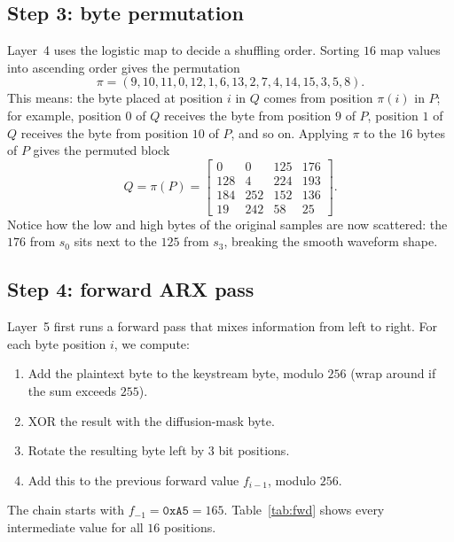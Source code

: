 \documentclass[pdflatex,sn-mathphys-num]{sn-jnl}%
\theoremstyle{thmstyleone}%
\theoremstyle{thmstyletwo}%
\theoremstyle{thmstylethree}%
\begin{document}
\subsection{Step 3: byte permutation}

Layer~4 uses the logistic map to decide a shuffling order. Sorting $16$ map values into ascending order gives the permutation
\begin{equation*}
\pi=(9,10,11,0,12,1,6,13,2,7,4,14,15,3,5,8).
\end{equation*}
This means: the byte placed at position $i$ in $Q$ comes from position $\pi(i)$ in $P$; for example, position $0$ of $Q$ receives the byte from position $9$ of $P$, position $1$ of $Q$ receives the byte from position $10$ of $P$, and so on. Applying $\pi$ to the $16$ bytes of $P$ gives the permuted block
\begin{equation*}
Q=\pi(P)=\begin{bmatrix}0&0&125&176\\128&4&224&193\\184&252&152&136\\19&242&58&25\end{bmatrix}.
\end{equation*}
Notice how the low and high bytes of the original samples are now scattered: the $176$ from $s_0$ sits next to the $125$ from $s_3$, breaking the smooth waveform shape.

\subsection{Step 4: forward ARX pass}

Layer~5 first runs a forward pass that mixes information from left to right. For each byte position $i$, we compute:
\begin{enumerate}
\item Add the plaintext byte to the keystream byte, modulo $256$ (wrap around if the sum exceeds $255$).
\item XOR the result with the diffusion-mask byte.
\item Rotate the resulting byte left by $3$ bit positions.
\item Add this to the previous forward value $f_{i-1}$, modulo $256$.
\end{enumerate}
The chain starts with $f_{-1}=\texttt{0xA5}=165$. Table~\ref{tab:fwd} shows every intermediate value for all $16$ positions.
\end{document}
